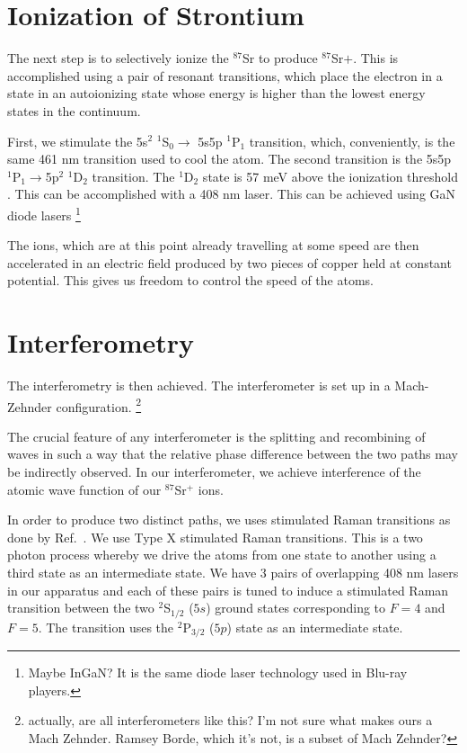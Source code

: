 \section{Ionization of Strontium}
 
The next step is to selectively ionize the $^{87}$Sr to produce $^{87}$Sr$+$. This is accomplished using a pair of resonant transitions, which place the electron in a state in an autoionizing state whose energy is higher than the lowest energy states in the continuum. 

First, we stimulate the 5s$^2$ $^1$S$_0 \rightarrow$ 5s5p $^1$P$_1$ transition, which, conveniently, is the same 461 nm transition used to cool the atom. The second transition is the 5s5p $^1$P$_1\rightarrow$5p$^2$ $^1$D$_2$ transition. The $^1$D$_2$ state is 57 meV above the ionization threshold \cite{NSFprop}. This can be accomplished with a 408 nm laser. This can be achieved using GaN diode lasers \footnote{Maybe InGaN? It is the same diode laser technology used in Blu-ray players.}


The ions, which are at this point already travelling at some speed are then accelerated in an electric field produced by two pieces of copper held at constant potential. This gives us freedom to control the speed of the atoms. 


\section{Interferometry}

The interferometry is then achieved. The interferometer is set up in a Mach-Zehnder configuration. \footnote{actually, are all interferometers like this? I'm not sure what makes ours a Mach Zehnder. Ramsey Borde, which it's not, is a subset of Mach Zehnder? }

The crucial feature of any interferometer is the splitting and recombining of waves in such a way that the relative phase difference between the two paths may be indirectly observed. In our interferometer, we achieve interference of the atomic wave function of our $^{87}$Sr$^+$ ions. 

In order to produce two distinct paths, we uses stimulated Raman transitions as done by Ref.\ \cite{kasevichChu1991}. We use Type X stimulated Raman transitions. This is a two photon process whereby we drive the atoms from one state to another using a third state as an intermediate state. We have 3 pairs of overlapping 408 nm lasers in our apparatus and each of these pairs is tuned to induce a stimulated Raman transition between the two $^2$S$_{1/2}$ ($5s$) ground states corresponding to $F=4$ and $F=5$. The transition uses the $^2$P$_{3/2}$ ($5p$) state as an intermediate state. 

